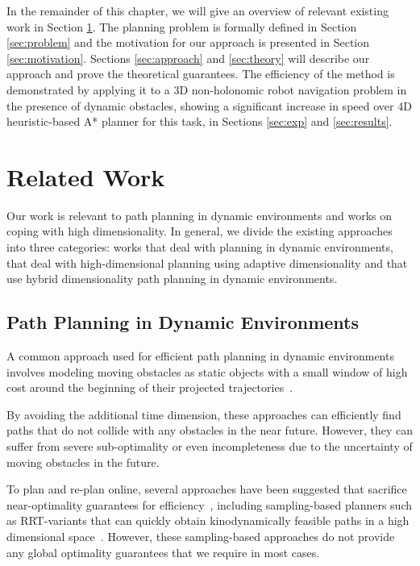 In the remainder of this chapter, we will give an overview of relevant existing work in Section \ref{sec:related-work}. 
The planning problem is formally defined in Section \ref{sec:problem} and the motivation for our approach is presented in Section \ref{sec:motivation}.
Sections \ref{sec:approach} and \ref{sec:theory} will describe our approach and prove the theoretical guarantees. The efficiency of the method is demonstrated by applying it to a 3D non-holonomic robot navigation problem in the presence of dynamic obstacles, showing a significant increase in speed over 4D heuristic-based A* planner for this task, in Sections \ref{sec:exp} and \ref{sec:results}.

\section{Related Work}
\label{sec:related-work}
Our work is relevant to path planning in dynamic environments and works on coping with high dimensionality. In general, we divide the existing approaches into three categories: works that deal with planning in dynamic environments, that deal with high-dimensional planning using adaptive dimensionality and that use hybrid dimensionality path planning in dynamic environments.

\subsection{Path Planning in Dynamic Environments}

A common approach used for efficient path planning in dynamic environments involves modeling moving obstacles as static objects with a small window of high cost around the beginning of their projected trajectories~\cite{likhachev2009planning,rufli2009smooth}. 

By avoiding the additional time dimension,
these approaches can efficiently find paths that do not collide with any obstacles in the near future. However, they can suffer from severe sub-optimality or even incompleteness due to the uncertainty of moving obstacles in the future.

To plan and re-plan online, several approaches have been suggested that sacrifice near-optimality guarantees for efficiency~\cite{van2006anytime}, including sampling-based planners such as RRT-variants that can quickly obtain kinodynamically feasible paths in a high dimensional space~\cite{bekris2007greedy,petti2005safe}. However, these sampling-based approaches do not provide any global optimality guarantees that we require in most cases. 

